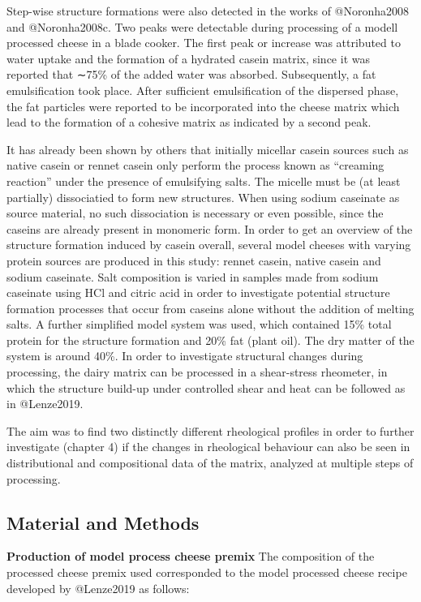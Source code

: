 \documentclass[
]{article}
\begin{document}
Step-wise structure formations were also detected in the works of
@Noronha2008 and @Noronha2008c. Two peaks were detectable during
processing of a modell processed cheese in a blade cooker. The first
peak or increase was attributed to water uptake and the formation of a
hydrated casein matrix, since it was reported that ∼75\% of the added
water was absorbed. Subsequently, a fat emulsification took place. After
sufficient emulsification of the dispersed phase, the fat particles were
reported to be incorporated into the cheese matrix which lead to the
formation of a cohesive matrix as indicated by a second peak.

It has already been shown by others that initially micellar casein
sources such as native casein or rennet casein only perform the process
known as ``creaming reaction'' under the presence of emulsifying salts.
The micelle must be (at least partially) dissociatied to form new
structures. When using sodium caseinate as source material, no such
dissociation is necessary or even possible, since the caseins are
already present in monomeric form. In order to get an overview of the
structure formation induced by casein overall, several model cheeses
with varying protein sources are produced in this study: rennet casein,
native casein and sodium caseinate. Salt composition is varied in
samples made from sodium caseinate using HCl and citric acid in order to
investigate potential structure formation processes that occur from
caseins alone without the addition of melting salts. A further
simplified model system was used, which contained 15\% total protein for
the structure formation and 20\% fat (plant oil). The dry matter of the
system is around 40\%. In order to investigate structural changes during
processing, the dairy matrix can be processed in a shear-stress
rheometer, in which the structure build-up under controlled shear and
heat can be followed as in @Lenze2019.

The aim was to find two distinctly different rheological profiles in
order to further investigate (chapter 4) if the changes in rheological
behaviour can also be seen in distributional and compositional data of
the matrix, analyzed at multiple steps of processing.

\subsection{Material and Methods}

\textbf{Production of model process cheese premix} \newline The
composition of the processed cheese premix used corresponded to the
model processed cheese recipe developed by @Lenze2019 as follows:
\end{document}
